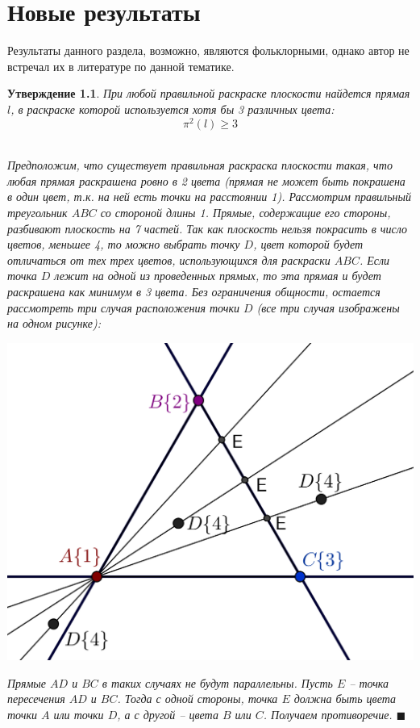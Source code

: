 \documentclass{report}%
\newtheorem{claim}[theorem]{Утверждение}
\newenvironment{proof}{\par\noindent{\bf Доказательство.}}{\hfill$\scriptstyle\blacksquare$}
\begin{document}
\chapter{Новые результаты}

Результаты данного раздела, возможно, являются фольклорными, однако автор не встречал их в литературе по данной тематике.

\begin{claim}
		При любой правильной раскраске плоскости найдется прямая $l$, в раскраске которой используется хотя бы 3 различных цвета:
		\begin{equation}
				\pi^2(l) \geq 3
		\end{equation} \\
		\begin{proof}
				Предположим, что существует правильная раскраска плоскости такая,
				что любая прямая раскрашена ровно в 2 цвета (прямая не может быть покрашена в один цвет,
				т.к. на ней есть точки на расстоянии 1). Рассмотрим правильный треугольник $ABC$ со стороной длины 1.
				Прямые, содержащие его стороны, разбивают  плоскость на 7 частей.
				Так как плоскость нельзя покрасить в число цветов, меньшее 4, то можно выбрать точку $D$,
				цвет которой будет отличаться от тех трех цветов, использующихся для раскраски $ABC$.
				Если точка $D$ лежит на одной из проведенных прямых, то эта прямая и будет раскрашена как минимум в 3 цвета.
				Без ограничения общности, остается рассмотреть три случая расположения точки $D$ (все три случая изображены на одном рисунке): \\
				\begin{center}
						\includegraphics[scale = 0.5]{my_claim1}
				\end{center}
				
				Прямые $AD$ и $BC$ в таких случаях не будут параллельны. Пусть $E$ – точка пересечения $AD$ и $BC$.
				Тогда с одной стороны, точка $E$ должна быть цвета точки $A$ или точки $D$, а с другой – цвета $B$ или $C$. Получаем противоречие. 
		\end{proof}
\end{claim}
\end{document}
